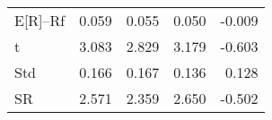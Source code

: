 \begin{tabular}{lrrrr}
\toprule
\midrule
E[R]--Rf & 0.059 & 0.055 & 0.050 & -0.009 \\
t & 3.083 & 2.829 & 3.179 & -0.603 \\
Std & 0.166 & 0.167 & 0.136 & 0.128 \\
SR & 2.571 & 2.359 & 2.650 & -0.502 \\
\bottomrule
\end{tabular}
